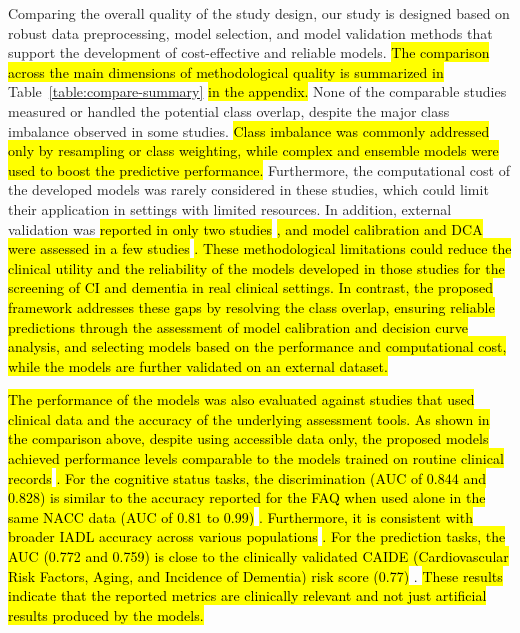 Comparing the overall quality of the study design, our study is designed based on robust data preprocessing, model selection, and model validation methods that support the development of cost-effective and reliable models. \hl{The comparison across the main dimensions of methodological quality is summarized in} Table~\ref{table:compare-summary} \hl{in the appendix.} None of the comparable studies measured or handled the potential class overlap, despite the major class imbalance observed in some studies. \hl{Class imbalance was commonly addressed only by resampling or class weighting, while complex and ensemble models were used to boost the predictive performance.} Furthermore, the computational cost of the developed models was rarely considered in these studies, which could limit their application in settings with limited resources. In addition, external validation was \hl{reported in only two studies} \cite{Cui2024Prediction, abbas2024Explainable}\hl{, and model calibration and DCA were assessed in a few studies} \cite{Cui2024Prediction, Georgiev2024Predicting, Li2023Machine, Twait2023Dementia}\hl{. These methodological limitations could reduce the clinical utility and the reliability of the models developed in those studies for the screening of CI and dementia in real clinical settings. In contrast, the proposed framework addresses these gaps by resolving the class overlap, ensuring reliable predictions through the assessment of model calibration and decision curve analysis, and selecting models based on the performance and computational cost, while the models are further validated on an external dataset.}

\hl{The performance of the models was also evaluated against studies that used clinical data and the accuracy of the underlying assessment tools. As shown in the comparison above, despite using accessible data only, the proposed models achieved performance levels comparable to the models trained on routine clinical records} \cite{Richter2025Cognitive, Akter2025Using, Sharma2024Leveraging}\hl{. For the cognitive status tasks, the discrimination (AUC of 0.844 and 0.828) is similar to the accuracy reported for the FAQ when used alone in the same NACC data (AUC of 0.81 to 0.99)} \cite{Gonzalez2022Comprehensive, Teng2010Utility}\hl{. Furthermore, it is consistent with broader IADL accuracy across various populations} \cite{Yemm2021Instrumental, CastillaRilo2007Instrumental}\hl{. For the prediction tasks, the AUC (0.772 and 0.759) is close to the clinically validated CAIDE (Cardiovascular Risk Factors, Aging, and Incidence of Dementia) risk score (0.77)} \cite{Kivipelto2006Risk, James2021Performance}. \hl{These results indicate that the reported metrics are clinically relevant and not just artificial results produced by the models.}
